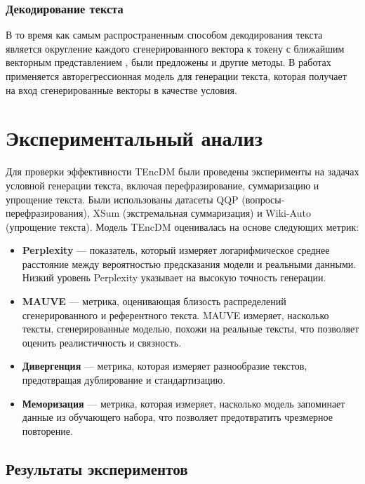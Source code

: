 \documentclass[a4paper, 12pt]{article}
\begin{document}
\subsubsection{Декодирование текста}
В то время как самым распространенным способом декодирования текста является округление каждого сгенерированного вектора к токену с ближайшим векторным представлением \cite{diffusionlm, diffuseq}, были предложены и другие методы.
В работах \cite{planner, ld4lg} применяется авторегрессионная модель для генерации текста, которая получает на вход сгенерированные векторы в качестве условия.



\section{Экспериментальный анализ}
Для проверки эффективности TEncDM были проведены эксперименты на задачах условной генерации текста, включая перефразирование, суммаризацию и упрощение текста. Были использованы датасеты QQP \cite{qqp} (вопросы-перефразирования), XSum \cite{xsum} (экстремальная суммаризация) и Wiki-Auto \cite{wiki_auto} (упрощение текста). Модель TEncDM оценивалась на основе следующих метрик:

\begin{itemize}
    \item \textbf{Perplexity} — показатель, который измеряет логарифмическое среднее расстояние между вероятностью предсказания модели и реальными данными. Низкий уровень Perplexity указывает на высокую точность генерации.
    \item \textbf{MAUVE} — метрика, оценивающая близость распределений сгенерированного и референтного текста. MAUVE измеряет, насколько тексты, сгенерированные моделью, похожи на реальные тексты, что позволяет оценить реалистичность и связность.
    \item \textbf{Дивергенция} — метрика, которая измеряет разнообразие текстов, предотвращая дублирование и стандартизацию.
    \item \textbf{Меморизация} — метрика, которая измеряет, насколько модель запоминает данные из обучающего набора, что позволяет предотвратить чрезмерное повторение.
\end{itemize}

\subsection{Результаты экспериментов}
\end{document}
